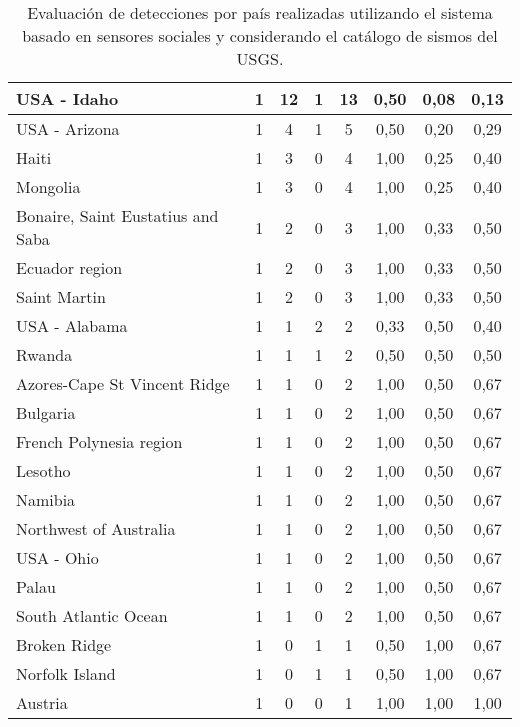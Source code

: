{\begin{table}[!ht]
\begin{tabular}{|l|ccc|c|ccc|}
USA - Idaho	 & 1 	 & 12 	 & 1 	& 13	 & 0,50 &	0,08 &	0,13 \\ \hline
USA - Arizona	 & 1 	 & 4 	 & 1 	& 5	 & 0,50 &	0,20 &	0,29 \\ \hline
Haiti	 & 1 	 & 3 	 & 0   	& 4	 & 1,00 &	0,25 &	0,40 \\ \hline
Mongolia	 & 1 	 & 3 	 & 0   	& 4	 & 1,00 &	0,25 &	0,40 \\ \hline
Bonaire, Saint Eustatius and Saba 	 & 1 	 & 2 	 & 0   	& 3	 & 1,00 &	0,33 &	0,50 \\ \hline
Ecuador region	 & 1 	 & 2 	 & 0   	& 3	 & 1,00 &	0,33 &	0,50 \\ \hline
Saint Martin	 & 1 	 & 2 	 & 0   	& 3	 & 1,00 &	0,33 &	0,50 \\ \hline
USA - Alabama	 & 1 	 & 1 	 & 2 	& 2	 & 0,33 &	0,50 &	0,40 \\ \hline
Rwanda	 & 1 	 & 1 	 & 1 	& 2	 & 0,50 &	0,50 &	0,50 \\ \hline
Azores-Cape St Vincent Ridge	 & 1 	 & 1 	 & 0   	& 2	 & 1,00 &	0,50 &	0,67 \\ \hline
Bulgaria	 & 1 	 & 1 	 & 0   	& 2	 & 1,00 &	0,50 &	0,67 \\ \hline
French Polynesia region	 & 1 	 & 1 	 & 0   	& 2	 & 1,00 &	0,50 &	0,67 \\ \hline
Lesotho	 & 1 	 & 1 	 & 0   	& 2	 & 1,00 &	0,50 &	0,67 \\ \hline
Namibia	 & 1 	 & 1 	 & 0   	& 2	 & 1,00 &	0,50 &	0,67 \\ \hline
Northwest of Australia	 & 1 	 & 1 	 & 0   	& 2	 & 1,00 &	0,50 &	0,67 \\ \hline
USA - Ohio	 & 1 	 & 1 	 & 0   	& 2	 & 1,00 &	0,50 &	0,67 \\ \hline
Palau	 & 1 	 & 1 	 & 0   	& 2	 & 1,00 &	0,50 &	0,67 \\ \hline
South Atlantic Ocean	 & 1 	 & 1 	 & 0   	& 2	 & 1,00 &	0,50 &	0,67 \\ \hline
Broken Ridge	 & 1 	 & 0   	 & 1 	& 1	 & 0,50 &	1,00 &	0,67 \\ \hline
Norfolk Island	 & 1 	 & 0   	 & 1 	& 1	 & 0,50 &	1,00 &	0,67 \\ \hline
Austria	 & 1 	 & 0   	 & 0   	& 1	 & 1,00 &	1,00 &	1,00 \\ \hline
   \end{tabular}
  \caption{Evaluación de detecciones por país realizadas utilizando el sistema basado en sensores sociales y considerando el catálogo de sismos del USGS.}
  \label{table:all-detections-05}
\end{table}}

